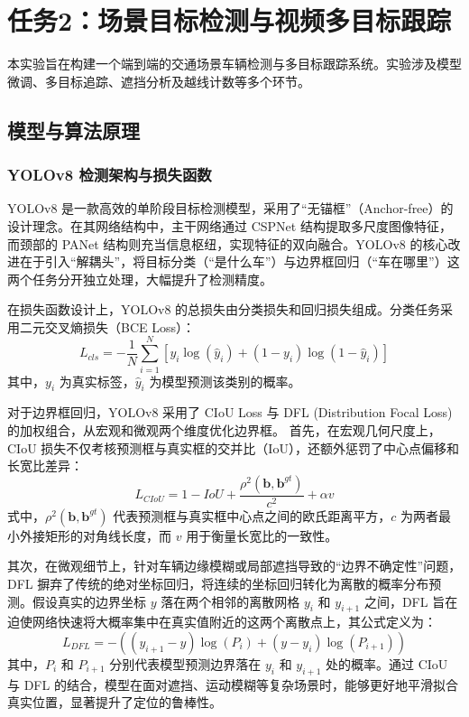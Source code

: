 \documentclass{article}
\begin{document}
\section{任务2：场景目标检测与视频多目标跟踪}

本实验旨在构建一个端到端的交通场景车辆检测与多目标跟踪系统。实验涉及模型微调、多目标追踪、遮挡分析及越线计数等多个环节。

\subsection{模型与算法原理}

\subsubsection{YOLOv8 检测架构与损失函数}
YOLOv8 是一款高效的单阶段目标检测模型，采用了“无锚框”（Anchor-free）的设计理念。在其网络结构中，主干网络通过 CSPNet 结构提取多尺度图像特征，而颈部的 PANet 结构则充当信息枢纽，实现特征的双向融合。YOLOv8 的核心改进在于引入“解耦头”，将目标分类（“是什么车”）与边界框回归（“车在哪里”）这两个任务分开独立处理，大幅提升了检测精度。

在损失函数设计上，YOLOv8 的总损失由分类损失和回归损失组成。分类任务采用二元交叉熵损失（BCE Loss）：
$$ L_{cls} = -\frac{1}{N} \sum_{i=1}^{N} [y_i \log(\hat{y}_i) + (1-y_i)\log(1-\hat{y}_i)] $$
其中，$y_i$ 为真实标签，$\hat{y}_i$ 为模型预测该类别的概率。

对于边界框回归，YOLOv8 采用了 CIoU Loss 与 DFL (Distribution Focal Loss) 的加权组合，从宏观和微观两个维度优化边界框。
首先，在宏观几何尺度上，CIoU 损失不仅考核预测框与真实框的交并比（IoU），还额外惩罚了中心点偏移和长宽比差异：
$$ L_{CIoU} = 1 - IoU + \frac{\rho^2(\mathbf{b}, \mathbf{b}^{gt})}{c^2} + \alpha v $$
式中，$\rho^2(\mathbf{b}, \mathbf{b}^{gt})$ 代表预测框与真实框中心点之间的欧氏距离平方，$c$ 为两者最小外接矩形的对角线长度，而 $v$ 用于衡量长宽比的一致性。

其次，在微观细节上，针对车辆边缘模糊或局部遮挡导致的“边界不确定性”问题，DFL 摒弃了传统的绝对坐标回归，将连续的坐标回归转化为离散的概率分布预测。假设真实的边界坐标 $y$ 落在两个相邻的离散网格 $y_i$ 和 $y_{i+1}$ 之间，DFL 旨在迫使网络快速将大概率集中在真实值附近的这两个离散点上，其公式定义为：
$$ L_{DFL} = - \left( (y_{i+1} - y)\log(P_i) + (y - y_i)\log(P_{i+1}) \right) $$
其中，$P_i$ 和 $P_{i+1}$ 分别代表模型预测边界落在 $y_i$ 和 $y_{i+1}$ 处的概率。通过 CIoU 与 DFL 的结合，模型在面对遮挡、运动模糊等复杂场景时，能够更好地平滑拟合真实位置，显著提升了定位的鲁棒性。
\end{document}
